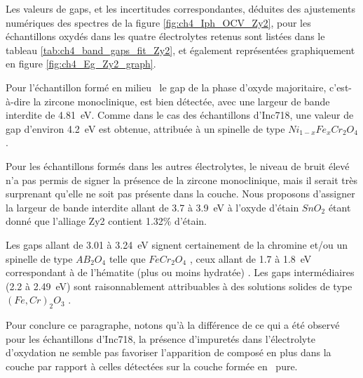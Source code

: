 \begin{refsection}
    Les valeurs de gaps, et les incertitudes correspondantes, déduites des ajustements numériques des spectres de la
    figure \ref{fig:ch4_Iph_OCV_Zy2}, pour les échantillons oxydés dans les quatre électrolytes retenus sont listées
    dans le tableau \ref{tab:ch4_band_gaps_fit_Zy2}, et
    également représentées graphiquement en figure \ref{fig:ch4_Eg_Zy2_graph}.

    Pour l’échantillon formé en milieu \water\, le gap de la phase d’oxyde majoritaire, c’est-à-dire la zircone
    monoclinique, est bien détectée, avec une largeur de bande interdite de 4.81~eV. Comme dans le cas des échantillons
    d’Inc718, une valeur de gap d’environ 4.2~eV est obtenue, attribuée à un spinelle de type $Ni_{1-x}Fe_xCr_2O_4$. 
    
    Pour les échantillons formés dans les autres électrolytes, le niveau de bruit élevé n’a pas permis de signer la
    présence de la zircone monoclinique, mais il serait très surprenant qu’elle ne soit pas présente dans la couche.
    Nous proposons d’assigner la largeur de bande interdite allant de 3.7 à 3.9~eV à l’oxyde d’étain $SnO_2$ étant donné
    que l’alliage Zy2 contient 1.32\% d’étain. 
    
    Les gaps allant de 3.01 à 3.24~eV signent certainement de la chromine et/ou un spinelle de type $AB_2O_4$ telle que
    $FeCr_2O_4$ \citep{DiQuarto2000}, ceux allant de 1.7 à 1.8~eV correspondant à de l’hématite (plus ou moins hydratée) \citep{Benaboud2007,Wouters2004,Srisrual2009}. 
    Les gaps
    intermédiaires (2.2 à 2.49~eV) sont raisonnablement attribuables à des solutions solides de type $(Fe, Cr)_2O_3$
    \citep{Srisrual2009}.
    
    Pour conclure ce paragraphe, notons qu’à la différence de ce qui a été observé pour les échantillons d’Inc718, la
    présence d’impuretés dans l’électrolyte d’oxydation ne semble pas favoriser l’apparition de composé en plus dans la
    couche par rapport à celles détectées sur la couche formée en \water\ pure.



\end{refsection}

